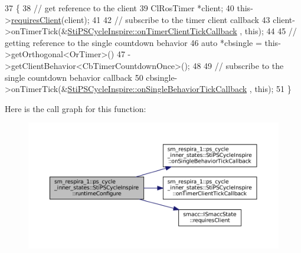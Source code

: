 \begin{DoxyCode}
37   \{
38     \textcolor{comment}{// get reference to the client}
39     ClRosTimer *client;
40     this->\hyperlink{classsmacc_1_1ISmaccState_a7f95c9f0a6ea2d6f18d1aec0519de4ac}{requiresClient}(client);
41 
42     \textcolor{comment}{// subscribe to the timer client callback}
43     client->onTimerTick(&\hyperlink{structsm__respira__1_1_1ps__cycle__inner__states_1_1StiPSCycleInspire_a2bc93095187e5dac5c21cb899555678c}{StiPSCycleInspire::onTimerClientTickCallback}
      , \textcolor{keyword}{this});
44 
45     \textcolor{comment}{// getting reference to the single countdown behavior}
46     \textcolor{keyword}{auto} *cbsingle = this->getOrthogonal<OrTimer>()
47                          ->getClientBehavior<CbTimerCountdownOnce>();
48 
49     \textcolor{comment}{// subscribe to the single countdown behavior callback}
50     cbsingle->onTimerTick(&\hyperlink{structsm__respira__1_1_1ps__cycle__inner__states_1_1StiPSCycleInspire_ad95cb458b90dcbb2402b8e890f4b027d}{StiPSCycleInspire::onSingleBehaviorTickCallback}
      , \textcolor{keyword}{this});
51   \}
\end{DoxyCode}
Here is the call graph for this function\+:
\nopagebreak
\begin{figure}[H]
\begin{center}
\leavevmode
\includegraphics[width=350pt]{structsm__respira__1_1_1ps__cycle__inner__states_1_1StiPSCycleInspire_a9af0139728042cf48d7a9e5c70cd8f41_cgraph}
\end{center}
\end{figure}
\mbox{\label{structsm__respira__1_1_1ps__cycle__inner__states_1_1StiPSCycleInspire_ae25c1dc3d7e5e77c1fac2a79244006bd}} 
